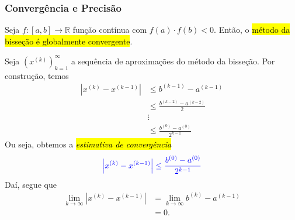 \subsubsection{Convergência e Precisão}

\begin{teo}\label{cap_eq1d_sec_bissec:teo:convp}
  Seja $f:[a, b]\to\mathbb{R}$ função contínua com $f(a)\cdot f(b) < 0$. Então, o \hl{método da bisseção é globalmente convergente}.
\end{teo}
\begin{dem}
  Seja $(x^{(k)})_{k=1}^\infty$ a sequência de aproximações do método da bisseção. Por construção, temos
  \begin{align}
    \left|x^{(k)} - x^{(k-1)}\right| &\leq b^{(k-1)}-a^{(k-1)}\\
                                     &\leq \frac{b^{(k-2)}-a^{(k-2)}}{2}\\
                                     &\vdots\\
                                     &\leq \frac{b^{(0)}-a^{(0)}}{2^{k-1}}
  \end{align}
  Ou seja, obtemos a \hl{\emph{estimativa de convergência}}
  \begin{equation}\label{cap_eq1d_sec_bissec:eq:estconvp}
    {\color{blue}\left|x^{(k)} - x^{(k-1)}\right| \leq \frac{b^{(0)}-a^{(0)}}{2^{k-1}}}
  \end{equation}
  Daí, segue que
  \begin{align}
    \lim_{k\to\infty} \left|x^{(k)}-x^{(k-1)}\right| &= \lim_{k\to\infty} b^{(k)}-a^{(k-1)}\\
                                                     &= 0.
  \end{align}
\end{dem}

